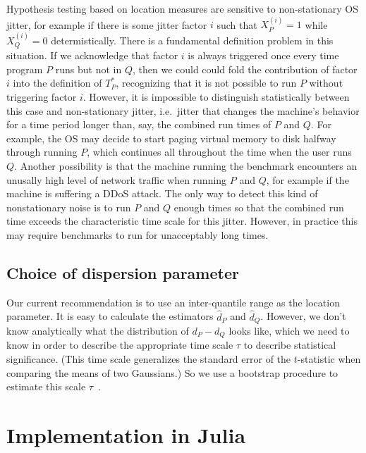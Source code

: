 \documentclass[conference]{IEEEtran}
\begin{document}
Hypothesis testing based on location measures are sensitive to non-stationary OS jitter, for example if there is some jitter factor $i$ such that $X^{(i)}_P = 1$ while $X^{(i)}_Q = 0$ determistically. There is a fundamental definition problem in this situation. If we acknowledge that factor $i$ is always triggered once every time program $P$ runs but not in $Q$, then we could could fold the contribution of factor $i$ into the definition of $T^*_P$, recognizing that it is not possible to run $P$ without triggering factor $i$. However, it is impossible to distinguish statistically between this case and non-stationary jitter, i.e.\ jitter that changes the machine's behavior for a time period longer than, say, the combined run times of $P$ and $Q$. For example, the OS may decide to start paging virtual memory to disk halfway through running $P$, which continues all throughout the time when the user runs $Q$. Another possibility is that the machine running the benchmark encounters an unusally high level of network traffic when running $P$ and $Q$, for example if the machine is suffering a DDoS attack. The only way to detect this kind of nonstationary noise is to run $P$ and $Q$ enough times so that the combined run time exceeds the characteristic time scale for this jitter. However, in practice this may require benchmarks to run for unacceptably long times.


\subsection{Choice of dispersion parameter}

Our current recommendation is to use an inter-quantile range as the location parameter. It is easy to calculate the estimators $\hat d_P$ and $\hat d_Q$. However, we don't know analytically what the distribution of $d_P - d_Q$ looks like, which we need to know in order to describe the appropriate time scale $\tau$ to describe statistical significance. (This time scale generalizes the standard error of the $t$-statistic when comparing the means of two Gaussians.) So we use a bootstrap procedure to estimate this scale $\tau$~\cite{Efron1981}.



\section{Implementation in Julia}
\end{document}
